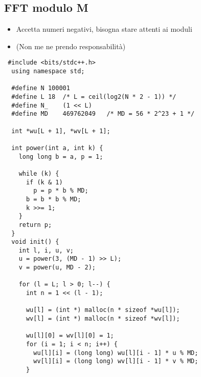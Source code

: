 \documentclass{article}
\begin{document}
\subsection{FFT modulo M}
\begin{itemize}
    \item Accetta numeri negativi, bisogna stare attenti ai moduli
    \item (Non me ne prendo responsabilità)
\end{itemize}
\begin{lstlisting}
 #include <bits/stdc++.h>
  using namespace std;

  #define N	100001
  #define L	18	/* L = ceil(log2(N * 2 - 1)) */
  #define N_	(1 << L)
  #define MD	469762049	/* MD = 56 * 2^23 + 1 */

  int *wu[L + 1], *wv[L + 1];

  int power(int a, int k) {
    long long b = a, p = 1;

    while (k) {
      if (k & 1)
        p = p * b % MD;
      b = b * b % MD;
      k >>= 1;
    }
    return p;
  }
  void init() {
    int l, i, u, v;
    u = power(3, (MD - 1) >> L);
    v = power(u, MD - 2);

    for (l = L; l > 0; l--) {
      int n = 1 << (l - 1);

      wu[l] = (int *) malloc(n * sizeof *wu[l]);
      wv[l] = (int *) malloc(n * sizeof *wv[l]);

      wu[l][0] = wv[l][0] = 1;
      for (i = 1; i < n; i++) {
        wu[l][i] = (long long) wu[l][i - 1] * u % MD;
        wv[l][i] = (long long) wv[l][i - 1] * v % MD;
      }


\end{lstlisting}
\end{document}
